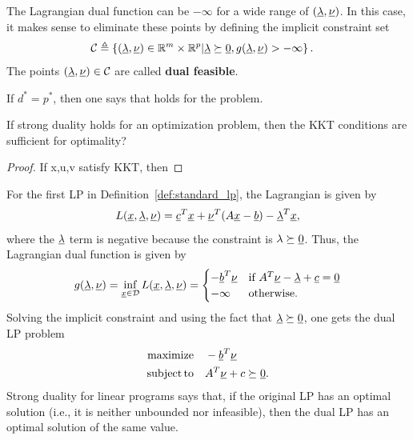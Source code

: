 The Lagrangian dual function can be $-\infty$ for a wide range of $(\underline{\lambda},\underline{\nu})$.
In this case, it makes sense to eliminate these points by defining the implicit constraint set
\begin{align*}
\mathcal{C} &\triangleq \left\{ (\underline{\lambda},\underline{\nu}) \in \mathbb{R}^m \times \mathbb{R}^p | \underline{\lambda}\succeq \underline{0},  g(\underline{\lambda},\underline{\nu}) > -\infty \right\}.
\end{align*}
The points $(\underline{\lambda},\underline{\nu}) \in \mathcal{C}$ are called \textbf{dual feasible}.

\begin{definition}
If $d^* = p^*$, then one says that  holds for the problem.
\end{definition}

\begin{theorem}
If strong duality holds for an optimization problem, then the KKT conditions are sufficient for optimality? 
\end{theorem}
\begin{proof}
If x,u,v satisfy KKT, then 
\end{proof}

\begin{example}
For the first LP in Definition~\ref{def:standard_lp}, the Lagrangian is given by
\[ L(\underline{x},\underline{\lambda},\underline{\nu}) = \underline{c}^T \underline{x} + \underline{\nu}^T (A\underline{x}-\underline{b}) - \underline{\lambda}^T \underline{x}, \]
where the $\underline{\lambda}$ term is negative because the constraint is $\lambda \succeq \underline{0}$.
Thus, the Lagrangian dual function is given by
\begin{equation*}
g(\underline{\lambda},\underline{\nu})
= \inf_{\underline{x}\in \mathcal{D}} L(\underline{x},\underline{\lambda},\underline{\nu})
= \begin{cases} -\underline{b}^T \underline{\nu} & \text{if }A^T \underline{\nu} - \underline{\lambda} + \underline{c} = \underline{0} \\
-\infty & \text{otherwise}. \end{cases}
\end{equation*}
Solving the implicit constraint and using the fact that $\underline{\lambda} \succeq \underline{0}$, one gets the dual LP problem
\begin{align*}
\mathrm{maximize} \quad & -\underline{b}^T \underline{\nu} \\
\mathrm{subject\,to} \quad & A^T \underline{\nu} + c \succeq \underline{0}.
\end{align*}
Strong duality for linear programs says that, if the original LP has an optimal solution (i.e., it is neither unbounded nor infeasible), then the dual LP has an optimal solution of the same value.
\end{example}

